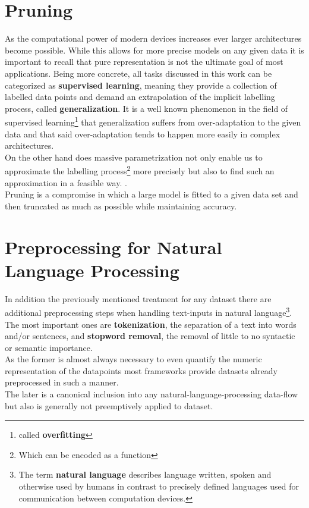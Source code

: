 \section{Pruning}
As the computational power of modern devices increases ever larger architectures become possible. While this allows for more precise models on any given data it is important to recall that pure representation is not the ultimate goal of most applications. Being more concrete, all tasks discussed in this work can be categorized as \textbf{supervised learning}, meaning they provide a collection of labelled data points and demand an extrapolation of the implicit labelling process, called \textbf{generalization}.
It is a well known phenomenon in the field of supervised learning\footnote{called \textbf{overfitting}} that generalization suffers from over-adaptation to the given data and that said over-adaptation tends to happen more easily in complex architectures.\\
On the other hand does massive parametrization not only enable us to approximate the labelling process\footnote{Which can be encoded as a function} more precisely but also to find such an approximation in a feasible way. \cite{Overparametrization}.\\
Pruning is a compromise in which a large model is fitted to a given data set and then truncated as much as possible while maintaining accuracy. 

\section{Preprocessing for Natural Language Processing}
In addition the previously mentioned treatment for any dataset there are additional preprocessing steps when handling text-inputs in natural language\footnote{The term \textbf{natural language} describes language written, spoken and otherwise used by humans in contrast to precisely defined languages used for communication between computation devices.}. The most important ones are \textbf{tokenization}, the separation of a text into words and/or sentences, and \textbf{stopword removal}, the removal of little to no syntactic or semantic importance.\\
As the former is almost always necessary to even quantify the numeric representation of the datapoints most frameworks provide datasets already preprocessed in such a manner.\\
The later is a canonical inclusion into any natural-language-processing data-flow but also is generally not preemptively applied to dataset.